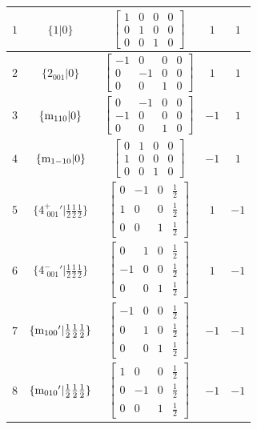 \documentclass[fleqn,8pt]{jsarticle}
\begin{document}
\begin{longtable}{ccccc}
$ 1 $ & $ \{1|0\} $ & $ \begin{bmatrix} 1 & 0 & 0 & 0 \\ 0 & 1 & 0 & 0 \\ 0 & 0 & 1 & 0 \end{bmatrix} $ & $ 1 $ & $ 1 $ \\ \hline
$ 2 $ & $ \{2{}_{001}|0\} $ & $ \begin{bmatrix} -1 & 0 & 0 & 0 \\ 0 & -1 & 0 & 0 \\ 0 & 0 & 1 & 0 \end{bmatrix} $ & $ 1 $ & $ 1 $ \\ \hline
$ 3 $ & $ \{{\rm m}_{110}|0\} $ & $ \begin{bmatrix} 0 & -1 & 0 & 0 \\ -1 & 0 & 0 & 0 \\ 0 & 0 & 1 & 0 \end{bmatrix} $ & $ -1 $ & $ 1 $ \\ \hline
$ 4 $ & $ \{{\rm m}_{1-10}|0\} $ & $ \begin{bmatrix} 0 & 1 & 0 & 0 \\ 1 & 0 & 0 & 0 \\ 0 & 0 & 1 & 0 \end{bmatrix} $ & $ -1 $ & $ 1 $ \\ \hline
$ 5 $ & $ \{4^{+}_{\,\,001}{}'|\frac{1}{2} \frac{1}{2} \frac{1}{2}\} $ & $ \begin{bmatrix} 0 & -1 & 0 & \frac{1}{2} \\ 1 & 0 & 0 & \frac{1}{2} \\ 0 & 0 & 1 & \frac{1}{2} \end{bmatrix} $ & $ 1 $ & $ -1 $ \\ \hline
$ 6 $ & $ \{4^{-}_{\,\,001}{}'|\frac{1}{2} \frac{1}{2} \frac{1}{2}\} $ & $ \begin{bmatrix} 0 & 1 & 0 & \frac{1}{2} \\ -1 & 0 & 0 & \frac{1}{2} \\ 0 & 0 & 1 & \frac{1}{2} \end{bmatrix} $ & $ 1 $ & $ -1 $ \\ \hline
$ 7 $ & $ \{{\rm m}_{100}{}'|\frac{1}{2} \frac{1}{2} \frac{1}{2}\} $ & $ \begin{bmatrix} -1 & 0 & 0 & \frac{1}{2} \\ 0 & 1 & 0 & \frac{1}{2} \\ 0 & 0 & 1 & \frac{1}{2} \end{bmatrix} $ & $ -1 $ & $ -1 $ \\ \hline
$ 8 $ & $ \{{\rm m}_{010}{}'|\frac{1}{2} \frac{1}{2} \frac{1}{2}\} $ & $ \begin{bmatrix} 1 & 0 & 0 & \frac{1}{2} \\ 0 & -1 & 0 & \frac{1}{2} \\ 0 & 0 & 1 & \frac{1}{2} \end{bmatrix} $ & $ -1 $ & $ -1 $ \\
\end{longtable}
\end{document}
